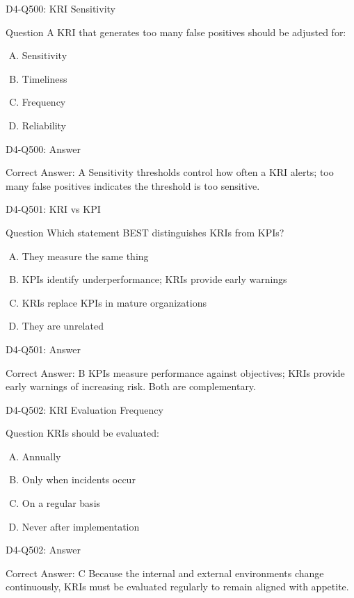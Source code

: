 \documentclass{beamer}
\begin{document}
\begin{frame}{D4-Q500: KRI Sensitivity}
	\begin{block}{Question}
		A KRI that generates too many false positives should be adjusted for:
	\end{block}
	\begin{enumerate}[(A)]
		\item Sensitivity
		\item Timeliness
		\item Frequency
		\item Reliability
	\end{enumerate}
\end{frame}
\begin{frame}{D4-Q500: Answer}
	\begin{block}{Correct Answer: A}
		Sensitivity thresholds control how often a KRI alerts; too many false positives indicates the threshold is too sensitive.
	\end{block}
\end{frame}

\begin{frame}{D4-Q501: KRI vs KPI}
	\begin{block}{Question}
		Which statement BEST distinguishes KRIs from KPIs?
	\end{block}
	\begin{enumerate}[(A)]
		\item They measure the same thing
		\item KPIs identify underperformance; KRIs provide early warnings
		\item KRIs replace KPIs in mature organizations
		\item They are unrelated
	\end{enumerate}
\end{frame}
\begin{frame}{D4-Q501: Answer}
	\begin{block}{Correct Answer: B}
		KPIs measure performance against objectives; KRIs provide early warnings of increasing risk. Both are complementary.
	\end{block}
\end{frame}

\begin{frame}{D4-Q502: KRI Evaluation Frequency}
	\begin{block}{Question}
		KRIs should be evaluated:
	\end{block}
	\begin{enumerate}[(A)]
		\item Annually
		\item Only when incidents occur
		\item On a regular basis
		\item Never after implementation
	\end{enumerate}
\end{frame}
\begin{frame}{D4-Q502: Answer}
	\begin{block}{Correct Answer: C}
		Because the internal and external environments change continuously, KRIs must be evaluated regularly to remain aligned with appetite.
	\end{block}
\end{frame}
\end{document}
